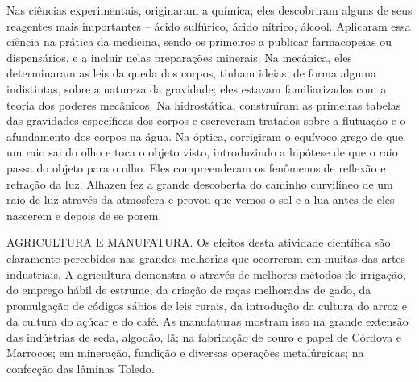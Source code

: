 \documentclass[11pt,a5paper,twoside,openany]{book}
\begin{document}
Nas ciências experimentais, originaram a química; eles descobriram alguns de seus reagentes mais importantes – ácido sulfúrico, ácido nítrico, álcool. Aplicaram essa ciência na prática da medicina, sendo os primeiros a publicar farmacopeias ou dispensários, e a incluir nelas preparações minerais. Na mecânica, eles determinaram as leis da queda dos corpos, tinham ideias, de forma alguma indistintas, sobre a natureza da gravidade; eles estavam familiarizados com a teoria dos poderes mecânicos. Na hidrostática, construíram as primeiras tabelas das gravidades específicas dos corpos e escreveram tratados sobre a flutuação e o afundamento dos corpos na água. Na óptica, corrigiram o equívoco grego de que um raio sai do olho e toca o objeto visto, introduzindo a hipótese de que o raio passa do objeto para o olho. Eles compreenderam os fenômenos de reflexão e refração da luz. Alhazen fez a grande descoberta do caminho curvilíneo de um raio de luz através da atmosfera e provou que vemos o sol e a lua antes de eles nascerem e depois de se porem.

AGRICULTURA E MANUFATURA. Os efeitos desta atividade científica são claramente percebidos nas grandes melhorias que ocorreram em muitas das artes industriais. A agricultura demonstra-o através de melhores métodos de irrigação, do emprego hábil de estrume, da criação de raças melhoradas de gado, da promulgação de códigos sábios de leis rurais, da introdução da cultura do arroz e da cultura do açúcar e do café. As manufaturas mostram isso na grande extensão das indústrias de seda, algodão, lã; na fabricação de couro e papel de Córdova e Marrocos; em mineração, fundição e diversas operações metalúrgicas; na confecção das lâminas Toledo.
\end{document}
